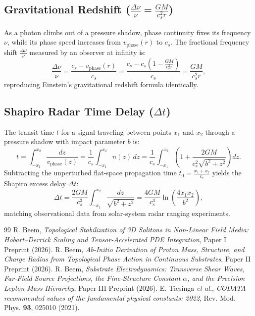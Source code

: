 \documentclass[11pt,a4paper]{article}
\begin{document}
	\subsection{Gravitational Redshift ($\frac{\Delta \nu}{\nu} = \frac{GM}{c_s^2 r}$)}
	As a photon climbs out of a pressure shadow, phase continuity fixes its frequency $\nu$, while its phase speed increases from $v_{\text{phase}}(r)$ to $c_s$. The fractional frequency shift $\frac{\Delta \nu}{\nu}$ measured by an observer at infinity is:
	\begin{equation}
		\frac{\Delta \nu}{\nu} = \frac{c_s - v_{\text{phase}}(r)}{c_s} = \frac{c_s - c_s\left(1 - \frac{GM}{c_s^2 r}\right)}{c_s} = \frac{GM}{c_s^2 r},
		\label{eq:redshift_derived}
	\end{equation}
	reproducing Einstein's gravitational redshift formula identically.
	
	\subsection{Shapiro Radar Time Delay ($\Delta t$)}
	The transit time $t$ for a signal traveling between points $x_1$ and $x_2$ through a pressure shadow with impact parameter $b$ is:
	\begin{equation}
		t = \int_{-x_1}^{x_2} \frac{dz}{v_{\text{phase}}(z)} = \frac{1}{c_s} \int_{-x_1}^{x_2} n(z) \, dz = \frac{1}{c_s} \int_{-x_1}^{x_2} \left( 1 + \frac{2GM}{c_s^2 \sqrt{b^2 + z^2}} \right) dz.
	\end{equation}
	Subtracting the unperturbed flat-space propagation time $t_0 = \frac{x_1 + x_2}{c_s}$ yields the Shapiro excess delay $\Delta t$:
	\begin{equation}
		\Delta t = \frac{2GM}{c_s^3} \int_{-x_1}^{x_2} \frac{dz}{\sqrt{b^2 + z^2}} = \frac{4GM}{c_s^3} \ln\left( \frac{4 x_1 x_2}{b^2} \right),
		\label{eq:shapiro_delay_derived}
	\end{equation}
	matching observational data from solar-system radar ranging experiments.
	
	\begin{thebibliography}{99}
		 R. Beem, \textit{Topological Stabilization of 3D Solitons in Non-Linear Field Media: Hobart--Derrick Scaling and Tensor-Accelerated PDE Integration}, Paper I Preprint (2026).
		 R. Beem, \textit{Ab-Initio Derivation of Proton Mass, Structure, and Charge Radius from Topological Phase Action in Continuous Substrates}, Paper II Preprint (2026).
		 R. Beem, \textit{Substrate Electrodynamics: Transverse Shear Waves, Far-Field Source Projections, the Fine-Structure Constant $\alpha$, and the Precision Lepton Mass Hierarchy}, Paper III Preprint (2026).
		 E. Tiesinga \textit{et al.}, \textit{CODATA recommended values of the fundamental physical constants: 2022}, Rev. Mod. Phys. \textbf{93}, 025010 (2021).
	\end{thebibliography}
	
\end{document}
